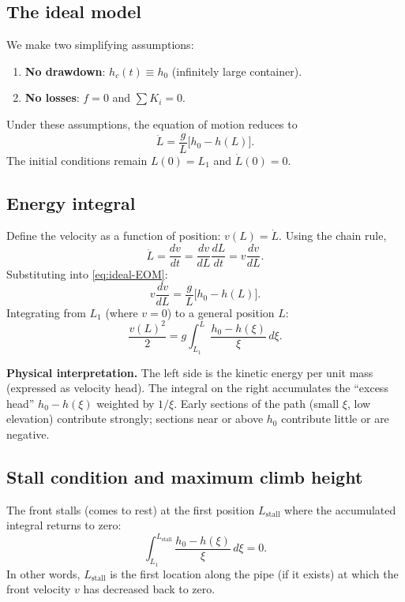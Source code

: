 \documentclass[11pt]{article}
\theoremstyle{definition}
\begin{document}
\subsection{The ideal model}

We make two simplifying assumptions:
\begin{enumerate}[nosep]
  \item \textbf{No drawdown}: $h_c(t) \equiv h_0$ (infinitely large container).
  \item \textbf{No losses}: $f = 0$ and $\sum K_i = 0$.
\end{enumerate}
Under these assumptions, the equation of motion reduces to
\begin{equation}
  \ddot{L} = \frac{g}{L}\bigl[h_0 - h(L)\bigr].
  \label{eq:ideal-EOM}
\end{equation}
The initial conditions remain $L(0) = L_1$ and $\dot{L}(0) = 0$.

\subsection{Energy integral}

\label{sec:stall-derivation}

Define the velocity as a function of position: $v(L) = \dot{L}$. Using the chain rule,
\[
  \ddot{L} = \frac{dv}{dt} = \frac{dv}{dL} \frac{dL}{dt} = v \frac{dv}{dL}.
\]
Substituting into \eqref{eq:ideal-EOM}:
\[
  v \frac{dv}{dL} = \frac{g}{L}\bigl[h_0 - h(L)\bigr].
\]
Integrating from $L_1$ (where $v = 0$) to a general position $L$:
\begin{equation}
  \frac{v(L)^2}{2} = g \int_{L_1}^{L} \frac{h_0 - h(\xi)}{\xi}\,d\xi.
  \label{eq:energy-integral}
\end{equation}

\textbf{Physical interpretation.} The left side is the kinetic energy per unit mass 
(expressed as velocity head). The integral on the right accumulates the ``excess head'' 
$h_0 - h(\xi)$ weighted by $1/\xi$. Early sections of the path (small $\xi$, low elevation) 
contribute strongly; sections near or above $h_0$ contribute little or are negative.

\subsection{Stall condition and maximum climb height}

The front stalls (comes to rest) at the first position $L_{\text{stall}}$ where the 
accumulated integral returns to zero:
\begin{equation}
  \boxed{\int_{L_1}^{L_{\text{stall}}} \frac{h_0 - h(\xi)}{\xi}\,d\xi = 0.}
  \label{eq:stall-condition}
\end{equation}
In other words, $L_{\text{stall}}$ is the first location along the pipe (if it exists) at 
which the front velocity $v$ has decreased back to zero.
\end{document}
